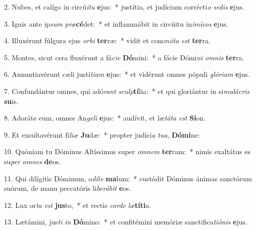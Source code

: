 2. Nubes, et calígo in circú\textit{i}\textit{tu} \textbf{e}jus:~*  justítia, et judícium corrécti\textit{o} \textit{se}\textit{dis} \textbf{e}jus.\

3. Ignis ante ip\textit{sum} \textit{præ}\textbf{cé}det:~*  et inflammábit in circúitu in\textit{i}\textit{mí}\textit{cos} \textbf{e}jus.\

4. Illuxérunt fúlgura ejus \textit{or}\textit{bi} \textbf{ter}ræ:~*  vidit et com\textit{mó}\textit{ta} \textit{est} \textbf{ter}ra.\

5. Montes, sicut cera fluxérunt a fá\textit{ci}\textit{e} \textbf{Dó}mini:~*  a fácie Dómi\textit{ni} \textit{om}\textit{nis} \textbf{ter}ra.\

6. Annuntiavérunt cæli justí\textit{ti}\textit{am} \textbf{e}jus:~*  et vidérunt omnes pópuli \textit{gló}\textit{ri}\textit{am} \textbf{e}jus.\

7. Confundántur omnes, qui adó\textit{rant} \textit{sculp}\textbf{tí}lia:~*  et qui gloriántur in si\textit{mu}\textit{lá}\textit{cris} \textbf{su}is.\

8. Adoráte eum, omnes An\textit{ge}\textit{li} \textbf{e}jus:~*  audívit, et læ\textit{tá}\textit{ta} \textit{est} \textbf{Si}on.\

9. Et exsultavérunt fí\textit{li}\textit{æ} \textbf{Ju}dæ:~*  propter judíci\textit{a} \textit{tu}\textit{a}, \textbf{Dó}\textbf{mi}ne:\

10. Quóniam tu Dóminus Altíssimus super \textit{om}\textit{nem} \textbf{ter}ram:~*  nimis exaltátus es su\textit{per} \textit{om}\textit{nes} \textbf{de}os.\

11. Qui dilígitis Dóminum, o\textit{dí}\textit{te} \textbf{ma}lum:~*  custódit Dóminus ánimas sanctórum suórum, de manu peccatóris li\textit{be}\textit{rá}\textit{bit} \textbf{e}os.\

12. Lux or\textit{ta} \textit{est} \textbf{jus}to,~*  et rectis \textit{cor}\textit{de} \textit{læ}\textbf{tí}\textbf{ti}a.\

13. Lætámini, jus\textit{ti} \textit{in} \textbf{Dó}mino:~*  et confitémini memóriæ sanctifica\textit{ti}\textit{ó}\textit{nis} \textbf{e}jus.\

